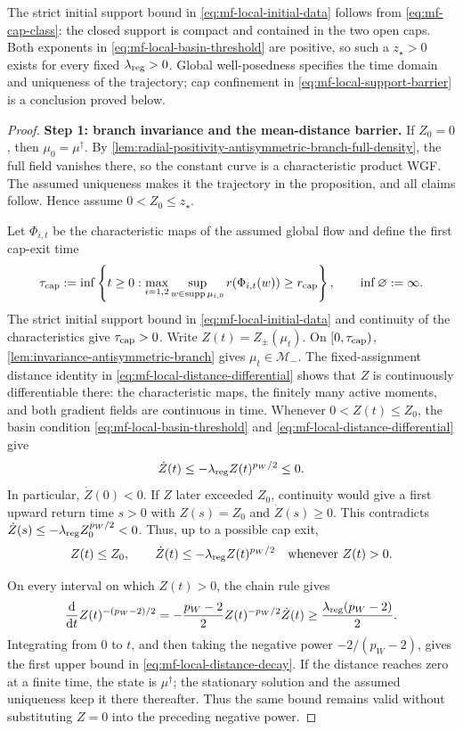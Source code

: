 The strict initial support bound in \cref{eq:mf-local-initial-data} follows
from \cref{eq:mf-cap-class}: the closed support is compact and contained in
the two open caps. Both exponents in \cref{eq:mf-local-basin-threshold} are
positive, so such a \(z_\star>0\) exists for every fixed
\(\lambda_{\mathrm{reg}}>0\). Global well-posedness specifies the time domain and
uniqueness of the trajectory; cap confinement in
\cref{eq:mf-local-support-barrier} is a conclusion proved below.

\begin{proof}
\par\noindent\textbf{Step 1: branch invariance and the mean-distance barrier.}
If \(Z_0=0\), then \(\mu_0=\mu^\dagger\). By
\cref{lem:radial-positivity-antisymmetric-branch-full-density}, the full field
vanishes there, so the constant curve is a characteristic product WGF.
The assumed uniqueness makes it the trajectory in the proposition, and all
claims follow. Hence assume \(0<Z_0\le z_\star\).

Let $\Phi_{i,t}$ be the characteristic maps of the assumed global flow and
define the first cap-exit time
\[
 \tau_{\rm cap}:=\inf\left\{t\ge0:
  \max_{i=1,2}\sup_{w\in\operatorname{supp}\mu_{i,0}}
  r(\Phi_{i,t}(w))\ge r_{\rm cap}\right\},
 \qquad \inf\varnothing:=\infty.
\]
The strict initial support bound in \cref{eq:mf-local-initial-data} and
continuity of the characteristics give $\tau_{\rm cap}>0$.
Write \(Z(t)=Z_\pm(\mu_t)\). On $[0,\tau_{\rm cap})$,
\cref{lem:invariance-antisymmetric-branch} gives
\(\mu_t\in\mathcal M_-\). The fixed-assignment distance identity in
\cref{eq:mf-local-distance-differential} shows that \(Z\) is continuously
differentiable there: the characteristic maps, the finitely many active
moments, and both gradient fields are continuous in time.
Whenever \(0<Z(t)\le Z_0\), the basin condition
\cref{eq:mf-local-basin-threshold} and
\cref{eq:mf-local-distance-differential} give
\begin{equation}
\label{eq:mf-distance-decay-differential}
 \dot Z(t)\le-\lambda_{\mathrm{reg}} Z(t)^{p_W/2}\le0.
\end{equation}
In particular, \(\dot Z(0)<0\). If \(Z\) later exceeded \(Z_0\), continuity
would give a first upward return time \(s>0\) with \(Z(s)=Z_0\) and
\(\dot Z(s)\ge0\). This contradicts
\(\dot Z(s)\le-\lambda_{\mathrm{reg}} Z_0^{p_W/2}<0\). Thus, up to a possible cap exit,
\[
 Z(t)\le Z_0,
 \qquad
 \dot Z(t)\le-\lambda_{\mathrm{reg}} Z(t)^{p_W/2}
 \quad\text{whenever }Z(t)>0.
\]

On every interval on which \(Z(t)>0\), the chain rule gives
\[
 \frac{\dd}{\dd t}Z(t)^{-(p_W-2)/2}
 =-\frac{p_W-2}{2}Z(t)^{-p_W/2}\dot Z(t)
 \ge\frac{\lambda_{\mathrm{reg}}(p_W-2)}2.
\]
Integrating from \(0\) to \(t\), and then taking the negative power
\(-2/(p_W-2)\), gives the first upper bound in
\cref{eq:mf-local-distance-decay}. If the distance reaches zero at a finite
time, the state is \(\mu^\dagger\); the stationary solution and the assumed
uniqueness keep it there thereafter. Thus the same bound remains valid without
substituting \(Z=0\) into the preceding negative power.


\end{proof}
